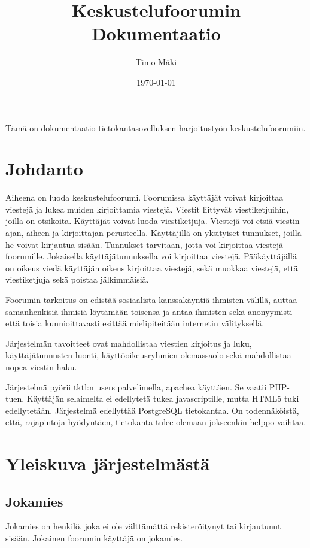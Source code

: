 \documentclass[a4paper, 12pt, finnish]{article}
\title{Keskustelufoorumin Dokumentaatio}
\author{Timo Mäki}
\date{\today}
\begin{document}
 \maketitle

Tämä on dokumentaatio tietokantasovelluksen harjoitustyön keskustelufoorumiin.

\newpage\null\thispagestyle{empty}\newpage
\tableofcontents
\newpage\null\thispagestyle{empty}\newpage
\section{Johdanto}

Aiheena on luoda keskustelufoorumi.
Foorumissa käyttäjät voivat kirjoittaa viestejä ja lukea muiden kirjoittamia viestejä.
Viestit liittyvät viestiketjuihin, joilla on otsikoita.
Käyttäjät voivat luoda viestiketjuja.
Viestejä voi etsiä viestin ajan, aiheen ja kirjoittajan perusteella.
Käyttäjillä on yksityiset tunnukset, joilla he voivat kirjautua sisään.
Tunnukset tarvitaan, jotta voi kirjoittaa viestejä foorumille.
Jokaisella käyttäjätunnuksella voi kirjoittaa viestejä.
Pääkäyttäjällä on oikeus viedä käyttäjän oikeus kirjoittaa viestejä, sekä muokkaa viestejä, että viestiketjuja sekä poistaa jälkimmäisiä.
\indent

Foorumin tarkoitus on edistää sosiaalista kanssakäyntiä ihmisten välillä, auttaa samanhenkisiä ihmisiä löytämään toisensa ja antaa ihmisten sekä anonyymisti että toisia kunnioittavasti esittää mielipiteitään internetin välityksellä.
\indent

Järjestelmän tavoitteet ovat mahdollistaa viestien kirjoitus ja luku, käyttäjätunnusten luonti, käyttöoikeusryhmien olemassaolo sekä mahdollistaa nopea viestin haku.
\indent

Järjestelmä pyörii tktl:n users palvelimella, apachea käyttäen.
Se vaatii PHP-tuen.
Käyttäjän selaimelta ei edellytetä tukea javascriptille, mutta HTML5 tuki edellytetään.
Järjestelmä edellyttää PostgreSQL tietokantaa.
On todennäköistä, että, rajapintoja hyödyntäen, tietokanta tulee olemaan jokseenkin helppo vaihtaa.

\newpage
\section{Yleiskuva järjestelmästä}
\subsection{Jokamies}
Jokamies on henkilö, joka ei ole välttämättä rekisteröitynyt tai kirjautunut sisään.
Jokainen foorumin käyttäjä on jokamies.
\end{document}
